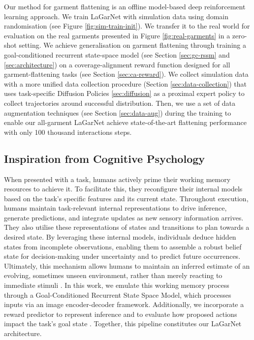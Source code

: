 \documentclass[journal]{IEEEtran}
\newcommand{\addinfo}[1]{\textcolor{myPurple}{#1}}
\newcommand{\addIncrementalg}[1]{\textcolor{mygreen}{#1}}
\begin{document}
\addinfo{Our  method for garment flattening is an offline model-based deep reinforcement learning approach. We train LaGarNet with simulation data using domain randomisation (see Figure \ref{fig:sim-train-init}). We transfer it to the real world for evaluation on the real garments presented in Figure \ref{fig:real-garments} in a zero-shot setting. We achieve generalisation on garment flattening through training a goal-conditioned recurrent state-space model (see Section \ref{sec:gc-rssm} and \ref{sec:architecture}) on a coverage-alignment reward function designed for all garment-flattening tasks (see Section \ref{sec:ca-reward}). We collect simulation data with a more unified data collection procedure  (Section \ref{sec:data-collection}) that uses task-specific Diffusion Policies \ref{sec:diffusion} as a proximal expert policy to collect trajectories around successful distribution. Then, we use a set of data augmentation techniques (see Section \ref{sec:data-aug}) during the training to enable our all-garment LaGarNet achieve state-of-the-art flattening performance with only 100 thousand interactions steps.}

\subsection{Inspiration from Cognitive Psychology}
\addIncrementalg{When presented with a task, humans actively prime their working memory resources to achieve it. To facilitate this, they reconfigure their internal models based on the task's specific features and its current state. Throughout execution, humans maintain task-relevant internal representations to drive inference, generate predictions, and integrate updates as new sensory information arrives. They also utilise these representations of states and transitions to plan towards a desired state. By leveraging these internal models, individuals deduce hidden states from incomplete observations, enabling them to assemble a robust belief state for decision-making under uncertainty and to predict future occurrences. Ultimately, this mechanism allows humans to maintain an inferred estimate of an evolving, sometimes unseen environment, rather than merely reacting to immediate stimuli \cite{miller2001integrative}. In this work, we emulate this working memory process through a Goal-Conditioned Recurrent State Space Model, which processes inputs via an image encoder-decoder framework. Additionally, we incorporate a reward predictor to represent inference and to evaluate how proposed actions impact the task's goal state \cite{hafner2019learning}. Together, this pipeline constitutes our LaGarNet architecture.}
\end{document}

